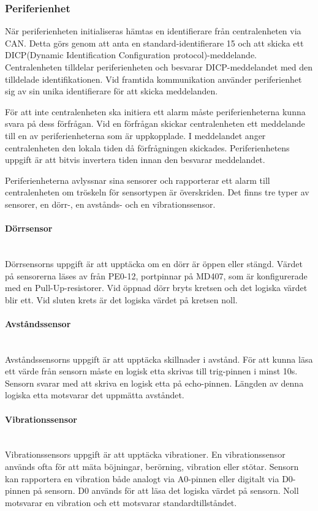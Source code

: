 \documentclass[a4paper]{article}
\newcommand{\subsubsubsection}[1]{\paragraph{#1}\mbox{}\\}
\begin{document}

\subsubsection{Periferienhet}
När periferienheten initialiseras hämtas en identifierare från centralenheten via CAN.
Detta görs genom att anta en standard-identifierare 15 och att skicka ett DICP(Dynamic Identification Configuration protocol)-meddelande.
Centralenheten tilldelar periferienheten och besvarar DICP-meddelandet med den tilldelade identifikationen.
Vid framtida kommunikation använder periferienhet sig av sin unika identifierare för att skicka meddelanden.

För att inte centralenheten ska initiera ett alarm måste periferienheterna kunna svara på dess förfrågan.
Vid en förfrågan skickar centralenheten ett meddelande till en av periferienheterna som är uppkopplade.
I meddelandet anger centralenheten den lokala tiden då förfrågningen skickades.
Periferienhetens uppgift är att bitvis invertera tiden innan den besvarar meddelandet.

Periferienheterna avlyssnar sina sensorer och rapporterar ett alarm till centralenheten om tröskeln för sensortypen är överskriden.
Det finns tre typer av sensorer, en dörr-, en avstånds- och en vibrationssensor.

\subsubsubsection{Dörrsensor}
Dörrsensorns uppgift är att upptäcka om en dörr är öppen eller stängd.
Värdet på sensorerna läses av från PE0-12, portpinnar på MD407, som är konfigurerade med en Pull-Up-resistorer.
Vid öppnad dörr bryts kretsen och det logiska värdet blir ett.
Vid sluten krets är det logiska värdet på kretsen noll.

\subsubsubsection{Avståndssensor}
Avståndssensorns uppgift är att upptäcka skillnader i avstånd.
För att kunna läsa ett värde från sensorn måste en logisk etta skrivas till trig-pinnen i minst 10\textmu s.
Sensorn svarar med att skriva en logisk etta på echo-pinnen.
Längden av denna logiska etta motsvarar det uppmätta avståndet.

\subsubsubsection{Vibrationssensor}
Vibrationssensors uppgift är att upptäcka vibrationer.
En vibrationssensor används ofta för att mäta böjningar, berörning, vibration eller stötar.
Sensorn kan rapportera en vibration både analogt via A0-pinnen eller digitalt via D0-pinnen på sensorn.
D0 används för att läsa det logiska värdet på sensorn.
Noll motsvarar en vibration och ett motsvarar standardtillståndet.
\end{document}
